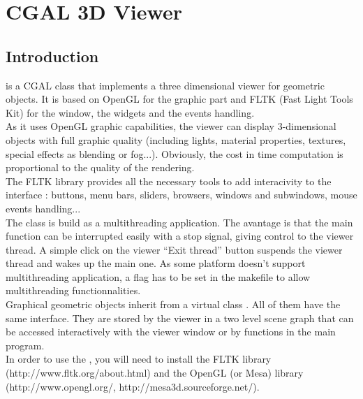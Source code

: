 
\chapter{CGAL 3D Viewer}

\section{Introduction}
 is a CGAL class that implements a three dimensional viewer for 
geometric objects. It is based on OpenGL for the graphic part and FLTK 
(Fast Light Tools Kit)
for the window, the widgets and the events handling. \\
As it uses OpenGL graphic capabilities, the viewer can display
3-dimensional objects with full graphic quality (including lights,
material properties, textures, special effects as blending
or fog...). Obviously, the cost in time computation is proportional
to the quality of the rendering.\\
The FLTK library provides all the necessary tools to add
interacivity to the interface : buttons, menu bars, sliders,
browsers, windows and subwindows, mouse events handling...\\
The class  is build as a multithreading application. The avantage is 
that the main function can be interrupted easily with a stop signal,
giving control to the viewer thread. A simple click on the viewer
``Exit thread'' button suspends the viewer thread and wakes up the main
one. As some platform doesn't support multithreading application, a
flag  has to be set in the makefile to allow
multithreading functionnalities.\\
Graphical geometric objects inherit from a virtual class 
. All of them have the same interface. They are stored by the
viewer in a two level scene graph that can be accessed interactively
with the viewer window or by functions in the main program. \\
In order to use the , you will need to install the FLTK
library (http://www.fltk.org/about.html) and the OpenGL (or Mesa)
library (http://www.opengl.org/, http://mesa3d.sourceforge.net/).


